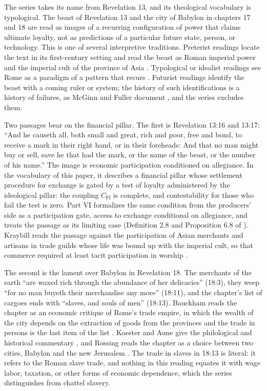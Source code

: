 \documentclass[11pt,letterpaper]{article}
\theoremstyle{definition}
\theoremstyle{remark}
\newcommand{\pF}{\mathsf{F}}
\newcommand{\pI}{\mathsf{I}}
\begin{document}
The series takes its name from Revelation 13, and its theological vocabulary is typological. The beast of Revelation 13 and the city of Babylon in chapters 17 and 18 are read as images of a recurring configuration of power that claims ultimate loyalty, not as predictions of a particular future state, person, or technology. This is one of several interpretive traditions. Preterist readings locate the text in its first-century setting and read the beast as Roman imperial power and the imperial cult of the province of Asia \citep{collins1984,kraybill1996}. Typological or idealist readings see Rome as a paradigm of a pattern that recurs \citep{bauckham1993}. Futurist readings identify the beast with a coming ruler or system; the history of such identifications is a history of failures, as McGinn and Fuller document \citep{mcginn1998,fuller1995}, and the series excludes them.

Two passages bear on the financial pillar. The first is Revelation 13:16 and 13:17: ``And he causeth all, both small and great, rich and poor, free and bond, to receive a mark in their right hand, or in their foreheads: And that no man might buy or sell, save he that had the mark, or the name of the beast, or the number of his name.'' The image is economic participation conditioned on allegiance. In the vocabulary of this paper, it describes a financial pillar whose settlement procedure for exchange is gated by a test of loyalty administered by the ideological pillar: the coupling $C_{\pF\pI}$ is complete, and contestability for those who fail the test is zero. Part VI formalizes the same condition from the producers' side as a participation gate, access to exchange conditional on allegiance, and treats the passage as its limiting case (Definition 2.8 and Proposition 6.8 of \citealt{long2026productive}). Kraybill reads the passage against the participation of Asian merchants and artisans in trade guilds whose life was bound up with the imperial cult, so that commerce required at least tacit participation in worship \citep{kraybill1996}.

The second is the lament over Babylon in Revelation 18. The merchants of the earth ``are waxed rich through the abundance of her delicacies'' (18:3), they weep ``for no man buyeth their merchandise any more'' (18:11), and the chapter's list of cargoes ends with ``slaves, and souls of men'' (18:13). Bauckham reads the chapter as an economic critique of Rome's trade empire, in which the wealth of the city depends on the extraction of goods from the provinces and the trade in persons is the last item of the list \citep{bauckham1991}. Koester and Aune give the philological and historical commentary \citep{koester2014,aune1998c}, and Rossing reads the chapter as a choice between two cities, Babylon and the new Jerusalem \citep{rossing1999}. The trade in slaves in 18:13 is literal: it refers to the Roman slave trade, and nothing in this reading equates it with wage labor, taxation, or other forms of economic dependence, which the series distinguishes from chattel slavery.
\end{document}
